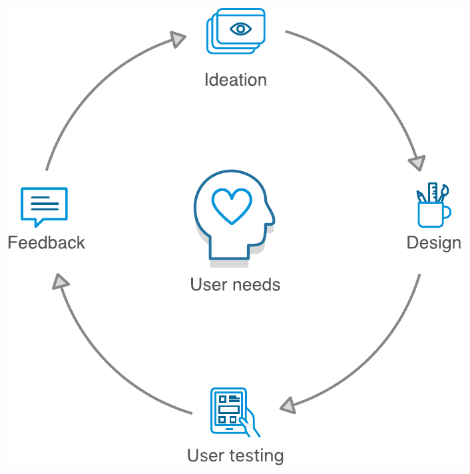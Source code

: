 \documentclass[xcolor=svgnames,10pt,aspectratio=1610]{beamer}
\begin{document}
\begin{frame}
\begin{minipage}{.49\textwidth}
\begin{minipage}{\textwidth}
\begin{minipage}{0.49\textwidth}
      \end{minipage}
      \begin{minipage}{0.49\textwidth}
        \centering
        \includegraphics[width=0.9\textwidth]{img/user_centric.pdf}
      \end{minipage}
    \end{minipage}
  \end{minipage}
\end{frame}
\end{document}
